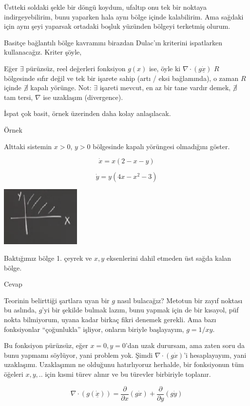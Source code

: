 \documentclass[12pt,fleqn]{article}\usepackage{../../common}
\begin{document}
Üstteki soldaki şekle bir döngü koydum, ufaltıp onu tek bir noktaya
indirgeyebilirim, bunu yaparken hala aynı bölge içinde kalabilirim. Ama sağdaki
için aynı şeyi yaparsak ortadaki boşluk yüzünden bölgeyi terketmiş
olurum.

Basitçe bağlantılı bölge kavramını birazdan Dulac'ın kriterini ispatlarken
kullanacağız. Kriter şöyle,

Eğer $\exists$ pürüzsüz, reel değerleri fonksiyon $g(x)$ ise, öyle ki $\nabla
\cdot (g \dot{\underline{x}})$ $R$ bölgesinde sıfır değil ve tek bir işarete
sahip (artı / eksi bağlamında), o zaman $R$ içinde $\cancel{\exists}$ kapalı
yörünge. Not: $\exists$ işareti mevcut, en az bir tane vardır demek,
$\cancel{\exists}$ tam tersi, $\nabla$ ise uzaklaşım (divergence).

İspat çok basit, örnek üzerinden daha kolay anlaşılacak.

Örnek

Alttaki sistemin $x>0$, $y>0$ bölgesinde kapalı yörüngesi olmadığını göster.

$$ \dot{x} = x(2 - x - y) $$

$$ \dot{y} = y(4x - x^2 - 3) $$

\includegraphics[height=3cm]{09_03.png}

Baktığımız bölge 1. çeyrek ve $x,y$ eksenlerini dahil etmeden üst sağda kalan
bölge. 

Cevap

Teorinin belirttiği şartlara uyan bir $g$ nasıl bulacağız? Metotun bir zayıf
noktası bu aslında, $g$'yi bir şekilde bulmak lazım, bunu yapmak için de bir
kısayol, püf nokta bilmiyorum, uyana kadar birkaç fikri denemek gerekli. Ama
bazı fonksiyonlar ``çoğunlukla'' işliyor, onların biriyle başlayayım, $g =
1/xy$.

Bu fonksiyon pürüzsüz, eğer $x=0,y=0$'dan uzak durursam, ama zaten soru da bunu
yapmamı söylüyor, yani problem yok. Şimdi $\nabla \cdot (g \dot{x})$'i
hesaplayayım, yani uzaklaşımı. Uzaklaşımın ne olduğunu hatırlıyoruz herhalde,
bir fonksiyonun tüm öğeleri $x,y,..$ için kısmi türev alınır ve bu türevler
birbiriyle toplanır.

$$
\nabla \cdot (g(\dot{\underline{x}})) =
\frac{\partial }{\partial x} (g \dot{x} ) +
\frac{\partial }{\partial y} (g \dot{y} )
$$
\end{document}
